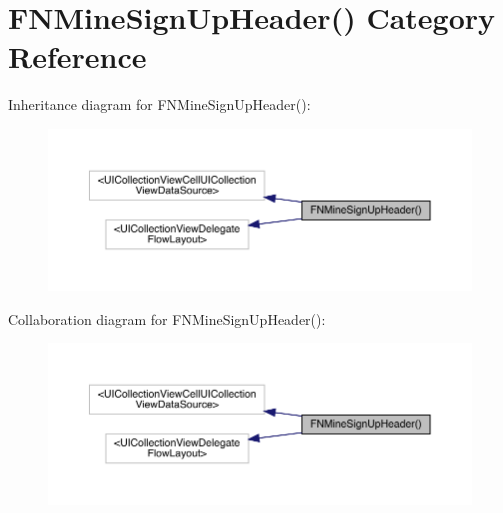 \hypertarget{category_f_n_mine_sign_up_header_07_08}{}\section{F\+N\+Mine\+Sign\+Up\+Header() Category Reference}
\label{category_f_n_mine_sign_up_header_07_08}


Inheritance diagram for F\+N\+Mine\+Sign\+Up\+Header()\+:\nopagebreak
\begin{figure}[H]
\begin{center}
\leavevmode
\includegraphics[width=350pt]{category_f_n_mine_sign_up_header_07_08__inherit__graph}
\end{center}
\end{figure}


Collaboration diagram for F\+N\+Mine\+Sign\+Up\+Header()\+:\nopagebreak
\begin{figure}[H]
\begin{center}
\leavevmode
\includegraphics[width=350pt]{category_f_n_mine_sign_up_header_07_08__coll__graph}
\end{center}
\end{figure}
